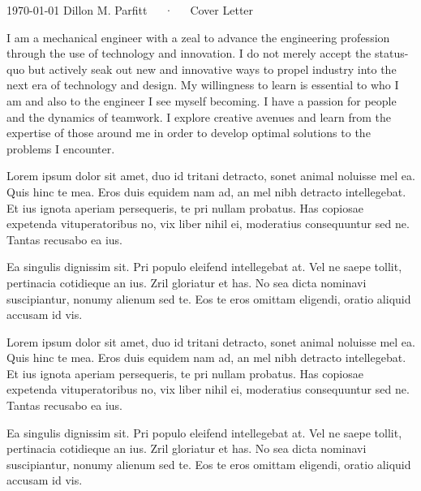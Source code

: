 \documentclass[11pt, a4paper]{include/CV_template}
\begin{document}
\makecvheader[R]

\makecvfooter
  {\today}
  {Dillon M. Parfitt~~~·~~~Cover Letter}
  {}

\makelettertitle

\begin{cvletter}

I am a mechanical engineer with a zeal to advance the engineering profession through the use of technology and innovation. I do not merely accept the status-quo 
but actively seak out new and innovative ways to propel industry into the next era of technology and design. My willingness to learn is essential to who I am and 
also to the engineer I see myself becoming. I have a passion for people and the dynamics of teamwork. I explore creative avenues and learn from the expertise of 
those around me in order to develop optimal solutions to the problems I encounter. 

Lorem ipsum dolor sit amet, duo id tritani detracto, sonet animal noluisse mel ea. 
Quis hinc te mea. Eros duis equidem nam ad, an mel nibh detracto intellegebat. Et ius 
ignota aperiam persequeris, te pri nullam probatus. Has copiosae expetenda vituperatoribus 
no, vix liber nihil ei, moderatius consequuntur sed ne. Tantas recusabo ea ius.

Ea singulis dignissim sit. Pri populo eleifend intellegebat at. Vel ne saepe tollit, pertinacia
cotidieque an ius. Zril gloriatur et has. No sea dicta nominavi suscipiantur, nonumy alienum sed te.
Eos te eros omittam eligendi, oratio aliquid accusam id vis.

Lorem ipsum dolor sit amet, duo id tritani detracto, sonet animal noluisse mel ea. 
Quis hinc te mea. Eros duis equidem nam ad, an mel nibh detracto intellegebat. Et ius 
ignota aperiam persequeris, te pri nullam probatus. Has copiosae expetenda vituperatoribus 
no, vix liber nihil ei, moderatius consequuntur sed ne. Tantas recusabo ea ius.

Ea singulis dignissim sit. Pri populo eleifend intellegebat at. Vel ne saepe tollit, pertinacia
cotidieque an ius. Zril gloriatur et has. No sea dicta nominavi suscipiantur, nonumy alienum sed te.
Eos te eros omittam eligendi, oratio aliquid accusam id vis.


\end{cvletter}


\makeletterclosing
\end{document}
